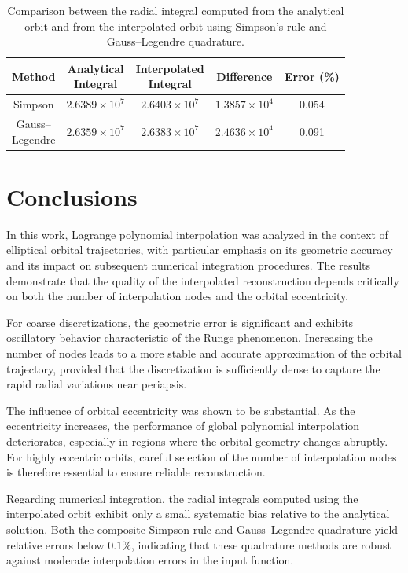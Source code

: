 \documentclass[reprint,amsmath,amssymb,aps]{revtex4-2}
\begin{document}
	\begin{table}[H]
		\centering
		\begin{tabular}{ccccc}
			\toprule
			Method & \makecell{Analytical\\Integral} & \makecell{Interpolated\\Integral} & Difference & Error (\%) \\
			\midrule
			Simpson & $2.6389\times 10^{7}$ & $2.6403\times 10^{7}$ & $1.3857\times 10^{4}$ & 0.054 \\
			\makecell{Gauss--\\Legendre} & $2.6359\times 10^{7}$ & $2.6383\times 10^{7}$ & $2.4636\times 10^{4}$ & 0.091 \\
			\bottomrule
		\end{tabular}
		\caption{Comparison between the radial integral computed from the analytical orbit and from the interpolated orbit using Simpson's rule and Gauss--Legendre quadrature.}
		\label{tab:integracion}
	\end{table}
	
	\section{Conclusions}
	In this work, Lagrange polynomial interpolation was analyzed in the context of elliptical orbital trajectories, with particular emphasis on its geometric accuracy and its impact on subsequent numerical integration procedures. The results demonstrate that the quality of the interpolated reconstruction depends critically on both the number of interpolation nodes and the orbital eccentricity.
	
	For coarse discretizations, the geometric error is significant and exhibits oscillatory behavior characteristic of the Runge phenomenon. Increasing the number of nodes leads to a more stable and accurate approximation of the orbital trajectory, provided that the discretization is sufficiently dense to capture the rapid radial variations near periapsis.
	
	The influence of orbital eccentricity was shown to be substantial. As the eccentricity increases, the performance of global polynomial interpolation deteriorates, especially in regions where the orbital geometry changes abruptly. For highly eccentric orbits, careful selection of the number of interpolation nodes is therefore essential to ensure reliable reconstruction.
	
	Regarding numerical integration, the radial integrals computed using the interpolated orbit exhibit only a small systematic bias relative to the analytical solution. Both the composite Simpson rule and Gauss--Legendre quadrature yield relative errors below $0.1\%$, indicating that these quadrature methods are robust against moderate interpolation errors in the input function.
	
\end{document}
